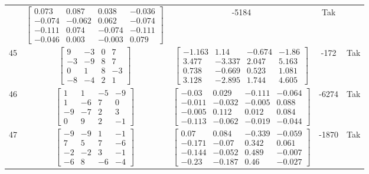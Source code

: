 \documentclass[a4paper,12pt]{article}
\begin{document}
\begin{tabular}{c c c c c}
&
$\begin{bmatrix} 0.073 & 0.087 & 0.038 & -0.036 \\ -0.074 & -0.062 & 0.062 & -0.074 \\ -0.111 & 0.074 & -0.074 & -0.111 \\ -0.046 & 0.003 & -0.003 & 0.079 \end{bmatrix}$
&
-5184
&
Tak
\\
45
&
$\begin{bmatrix} 9 & -3 & 0 & 7 \\ -3 & -9 & 8 & 7 \\ 0 & 1 & 8 & -3 \\ -8 & -4 & 2 & 1 \end{bmatrix}$
&
$\begin{bmatrix} -1.163 & 1.14 & -0.674 & -1.86 \\ 3.477 & -3.337 & 2.047 & 5.163 \\ 0.738 & -0.669 & 0.523 & 1.081 \\ 3.128 & -2.895 & 1.744 & 4.605 \end{bmatrix}$
&
-172
&
Tak
\\
46
&
$\begin{bmatrix} 1 & 1 & -5 & -9 \\ 1 & -6 & 7 & 0 \\ -9 & -7 & 2 & 3 \\ 0 & 9 & 2 & -1 \end{bmatrix}$
&
$\begin{bmatrix} -0.03 & 0.029 & -0.111 & -0.064 \\ -0.011 & -0.032 & -0.005 & 0.088 \\ -0.005 & 0.112 & 0.012 & 0.084 \\ -0.113 & -0.062 & -0.019 & -0.044 \end{bmatrix}$
&
-6274
&
Tak
\\
47
&
$\begin{bmatrix} -9 & -9 & 1 & -1 \\ 7 & 5 & 7 & -6 \\ -2 & -2 & 3 & -1 \\ -6 & 8 & -6 & -4 \end{bmatrix}$
&
$\begin{bmatrix} 0.07 & 0.084 & -0.339 & -0.059 \\ -0.171 & -0.07 & 0.342 & 0.061 \\ -0.144 & -0.052 & 0.489 & -0.007 \\ -0.23 & -0.187 & 0.46 & -0.027 \end{bmatrix}$
&
-1870
&
Tak
\\

\end{tabular}
\end{document}

